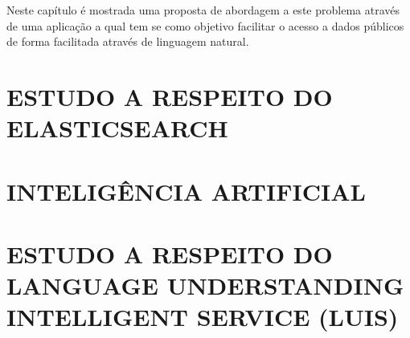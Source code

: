 Neste capítulo é mostrada uma proposta de abordagem a este problema através de uma aplicação a qual tem se como objetivo facilitar o acesso a dados públicos de forma facilitada através de linguagem natural.

\section{\uppercase{Estudo a respeito do Elasticsearch}}


\section{\uppercase{Inteligência Artificial}}


\section{\uppercase{Estudo a respeito do Language Understanding Intelligent Service (LUIS)}}



